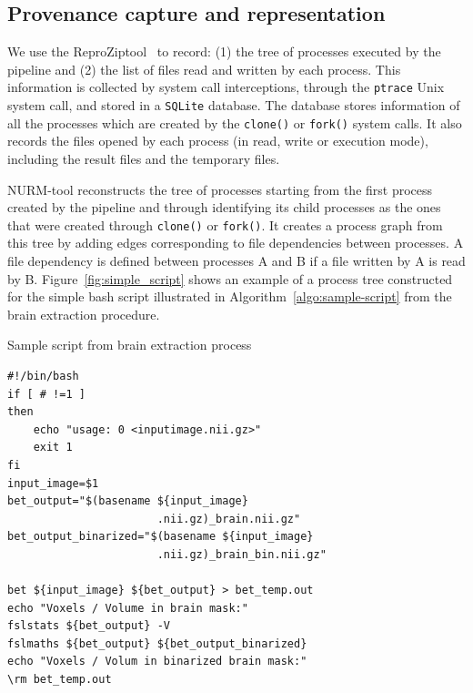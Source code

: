 \documentclass[a4paper,num-refs]{oup-contemporary}
\newcommand{\reprozip}[0]{ReproZip}
\begin{document}
\subsection{Provenance capture and representation}

We use the \reprozip tool~\cite{Chirigati2016} to record: (1) 
the tree of processes executed by the pipeline and (2) the list of 
files read and written by each process. This information is collected 
by system call interceptions, through the \texttt{ptrace} Unix system 
call, and stored in a \texttt{SQLite} database. The database stores 
information of all the processes which are created by the 
\texttt{clone()} or \texttt{fork()} system calls. It also records the 
files opened by each process (in read, write or execution mode), 
including the result files and the temporary files.

NURM-tool reconstructs the tree of processes starting from the first 
process created by the pipeline and through identifying its child 
processes as the ones that were created through \texttt{clone()} or 
\texttt{fork()}. It creates a process graph from this tree by adding 
edges corresponding to file dependencies between processes. A file 
dependency is defined between processes A and B if a file written by A 
is read by B. Figure~\ref{fig:simple_script} shows an example of a 
process tree constructed for the simple bash script illustrated in 
Algorithm~\ref{algo:sample-script} from the brain extraction procedure.


\begin{algorithm}[h!]
\caption{Sample script from brain extraction process}
\label{algo:sample-script}
\begin{verbatim}
#!/bin/bash
if [ # !=1 ]
then
    echo "usage: 0 <inputimage.nii.gz>"
    exit 1
fi
input_image=$1
bet_output="$(basename ${input_image} 
                       .nii.gz)_brain.nii.gz"
bet_output_binarized="$(basename ${input_image} 
                       .nii.gz)_brain_bin.nii.gz"

bet ${input_image} ${bet_output} > bet_temp.out
echo "Voxels / Volume in brain mask:"
fslstats ${bet_output} -V
fslmaths ${bet_output} ${bet_output_binarized}
echo "Voxels / Volum in binarized brain mask:"
\rm bet_temp.out
\end{verbatim}
\end{algorithm}
\end{document}
